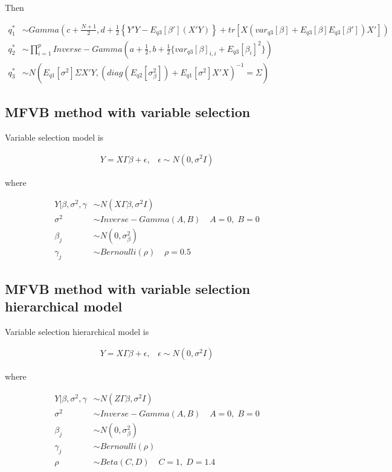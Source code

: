 \documentclass[11pt]{article}
\begin{document}
	Then
	
	\begin{align*}
	q_1^* &\sim Gamma\left(c + \frac{N+1}{2}, d + \frac{1}{2}\left\{Y'Y -E_{q3}[\beta'](X'Y)\right\} + tr\left[X(var_{q3}[\beta]+E_{q3}[\beta]E_{q3}[\beta'])X'\right]\right)\\
	q_2^* &\sim \prod_{i=1}^{p}Inverse-Gamma( a+ \frac{1}{2}, b + \frac{1}{2}\{var_{q3}[\beta]_{i,i} +E_{q3}[\beta_i]^2 \})\\
	q_3^* &\sim N\left(E_{q1}[\sigma^2]\Sigma X'Y,\left(diag(E_{q2}[\sigma_{\beta}^2]) + E_{q1}[\sigma^2]X'X \right)^{-1} = \Sigma \right)
	\end{align*}
	

	
	\subsection{MFVB method with variable selection}
	
	Variable selection model is
	
	\begin{align*}
	Y = X\Gamma\beta + \epsilon , \;\;\; \epsilon \sim N(0,\sigma^2 I)
	\end{align*}
	
	where 
	
	\begin{align*}
	Y|\beta,\sigma^2 ,\gamma &\sim N(X\Gamma\beta , \sigma^2 I)\\
	\sigma^2 &\sim Inverse-Gamma(A,B)  \;\;\;\ A=0,\;B=0\\
	\beta_j &\sim N(0, \sigma_{\beta}^2)\\
	\gamma_j &\sim Bernoulli(\rho) \;\;\;\ \rho=0.5
	\end{align*}
	


	
	
	\subsection{MFVB method with variable selection hierarchical model}
	
	Variable selection hierarchical model is
	
	\begin{align*}
	Y = X\Gamma\beta + \epsilon , \;\;\; \epsilon \sim N(0,\sigma^2 I)
	\end{align*}
	
	where 
	
	\begin{align*}
	Y|\beta,\sigma^2 ,\gamma &\sim N(Z\Gamma\beta , \sigma^2 I)\\
	\sigma^2 &\sim Inverse-Gamma(A,B)  \;\;\;\ A=0,\;B=0\\
	\beta_j &\sim N(0, \sigma_{\beta}^2)\\
	\gamma_j &\sim Bernoulli(\rho)\\
	\rho &\sim Beta(C,D) \;\;\;\ C=1,\;D=1.4
	\end{align*}
	
\end{document}

